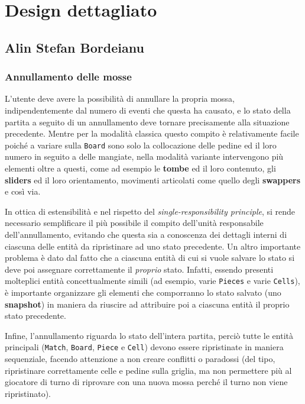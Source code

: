 \documentclass[a4paper,12pt]{report}
\begin{document}
\section{Design dettagliato}

\subsection{Alin Stefan Bordeianu}

\subsubsection{Annullamento delle mosse}

L'utente deve avere la possibilità di annullare la propria mossa, indipendentemente dal numero di eventi che questa ha causato, e lo stato della partita a seguito di un annullamento deve tornare precisamente alla situazione precedente. Mentre per la modalità classica questo compito è relativamente facile poiché a variare sulla \texttt{Board} sono solo la collocazione delle pedine ed il loro numero in seguito a delle mangiate, nella modalità variante intervengono più elementi oltre a questi, come ad esempio le \textbf{tombe} ed il loro contenuto, gli \textbf{sliders} ed il loro orientamento, movimenti articolati come quello degli \textbf{swappers} e così via.

In ottica di estensibilità e nel rispetto del \textit{single-responsibility principle}, si rende necessario semplificare il più possibile il compito dell'unità responsabile dell'annullamento, evitando che questa sia a conoscenza dei dettagli interni di ciascuna delle entità da ripristinare ad uno stato precedente. Un altro importante problema è dato dal fatto che a ciascuna entità di cui si vuole salvare lo stato si deve poi assegnare correttamente il \textit{proprio} stato. Infatti, essendo presenti molteplici entità concettualmente simili (ad esempio, varie \texttt{Pieces} e varie \texttt{Cells}), è importante organizzare gli elementi che comporranno lo stato salvato (uno \textbf{snapshot}) in maniera da riuscire ad attribuire poi a ciascuna entità il proprio stato precedente.

Infine, l'annullamento riguarda lo stato dell'intera partita, perciò tutte le entità principali (\texttt{Match}, \texttt{Board}, \texttt{Piece} e \texttt{Cell}) devono essere ripristinate in maniera sequenziale, facendo attenzione a non creare conflitti o paradossi (del tipo, ripristinare correttamente celle e pedine sulla griglia, ma non permettere più al giocatore di turno di riprovare con una nuova mossa perché il turno non viene ripristinato).
\end{document}
